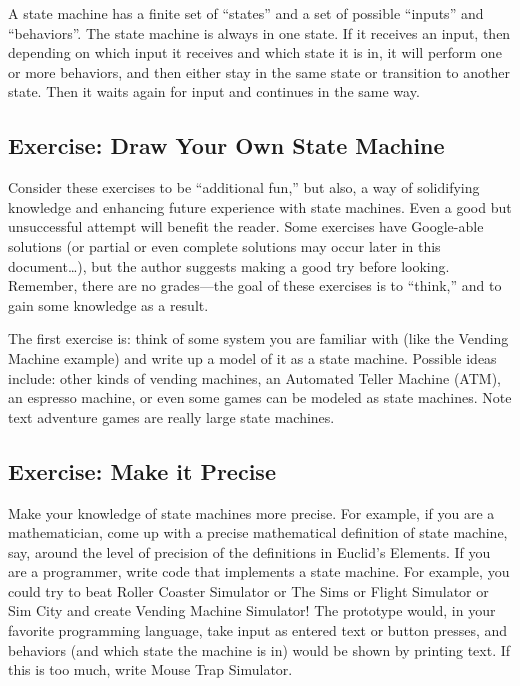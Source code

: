 A state machine has a finite set of ``states'' and a set of possible
``inputs'' and ``behaviors''. The state machine is always in one state.
If it receives an input, then depending on which input it receives and
which state it is in, it will perform one or more behaviors, and then
either stay in the same state or transition to another state. Then it
waits again for input and continues in the same way.

\subsection[Exercise: Draw Your Own State
Machine]{\texorpdfstring{\protect\hypertarget{anchor-4}{}{}Exercise:
Draw Your Own State
Machine}{Exercise: Draw Your Own State Machine}}\label{exercise-draw-your-own-state-machine}

Consider these exercises to be ``additional fun,'' but also, a way of
solidifying knowledge and enhancing future experience with state
machines. Even a good but unsuccessful attempt will benefit the reader.
Some exercises have Google-able solutions (or partial or even complete
solutions may occur later in this document\ldots{}), but the author
suggests making a good try before looking. Remember, there are no
grades---the goal of these exercises is to ``think,'' and to gain some
knowledge as a result.

The first exercise is: think of some system you are familiar with (like
the Vending Machine example) and write up a model of it as a state
machine. Possible ideas include: other kinds of vending machines, an
Automated Teller Machine (ATM), an espresso machine, or even some games
can be modeled as state machines. Note text adventure games are really
large state machines.

\subsection[Exercise: Make it
Precise]{\texorpdfstring{\protect\hypertarget{anchor-5}{}{}Exercise:
Make it
Precise}{Exercise: Make it Precise}}\label{exercise-make-it-precise}

Make your knowledge of state machines more precise. For example, if you
are a mathematician, come up with a precise mathematical definition of
state machine, say, around the level of precision of the definitions in
Euclid's Elements. If you are a programmer, write code that implements a
state machine. For example, you could try to beat Roller Coaster
Simulator or The Sims or Flight Simulator or Sim City and create Vending
Machine Simulator! The prototype would, in your favorite programming
language, take input as entered text or button presses, and behaviors
(and which state the machine is in) would be shown by printing text. If
this is too much, write Mouse Trap Simulator.

